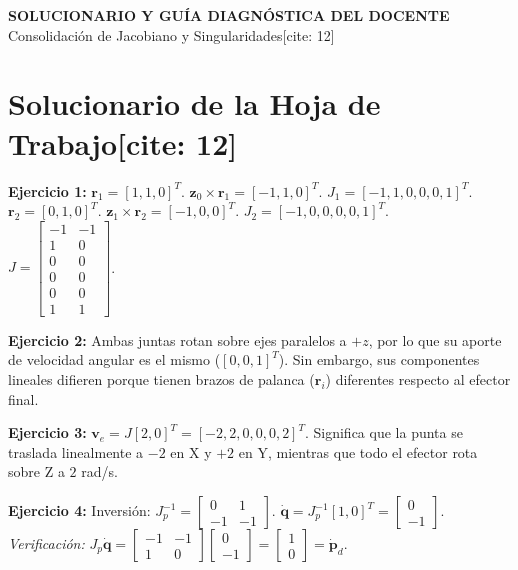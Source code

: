 \documentclass[11pt, a4paper]{article}
\begin{document}
\begin{center}
    \Large\textbf{\textcolor{red!80!black}{SOLUCIONARIO Y GUÍA DIAGNÓSTICA DEL DOCENTE}}\\[0.2cm]
    \normalsize Consolidación de Jacobiano y Singularidades[cite: 12]
\end{center}

\section*{Solucionario de la Hoja de Trabajo[cite: 12]}

\textbf{Ejercicio 1:}
$\mathbf{r}_1 = [1, 1, 0]^T$. $\mathbf{z}_0 \times \mathbf{r}_1 = [-1, 1, 0]^T$. $J_1 = [-1, 1, 0, 0, 0, 1]^T$. \\
$\mathbf{r}_2 = [0, 1, 0]^T$. $\mathbf{z}_1 \times \mathbf{r}_2 = [-1, 0, 0]^T$. $J_2 = [-1, 0, 0, 0, 0, 1]^T$. \\
$J = \begin{bmatrix} -1 & -1 \\ 1 & 0 \\ 0 & 0 \\ 0 & 0 \\ 0 & 0 \\ 1 & 1 \end{bmatrix}$.

\textbf{Ejercicio 2:} Ambas juntas rotan sobre ejes paralelos a $+z$, por lo que su aporte de velocidad angular es el mismo ($[0,0,1]^T$). Sin embargo, sus componentes lineales difieren porque tienen brazos de palanca ($\mathbf{r}_i$) diferentes respecto al efector final.

\textbf{Ejercicio 3:} $\mathbf{v}_e = J [2, 0]^T = [-2, 2, 0, 0, 0, 2]^T$. Significa que la punta se traslada linealmente a $-2$ en X y $+2$ en Y, mientras que todo el efector rota sobre Z a $2$ rad/s.

\textbf{Ejercicio 4:} Inversión: $J_p^{-1} = \begin{bmatrix} 0 & 1 \\ -1 & -1 \end{bmatrix}$. $\dot{\mathbf{q}} = J_p^{-1} [1, 0]^T = \begin{bmatrix} 0 \\ -1 \end{bmatrix}$. \\
\textit{Verificación:} $J_p \dot{\mathbf{q}} = \begin{bmatrix} -1 & -1 \\ 1 & 0 \end{bmatrix} \begin{bmatrix} 0 \\ -1 \end{bmatrix} = \begin{bmatrix} 1 \\ 0 \end{bmatrix} = \dot{\mathbf{p}}_d$.
\end{document}
